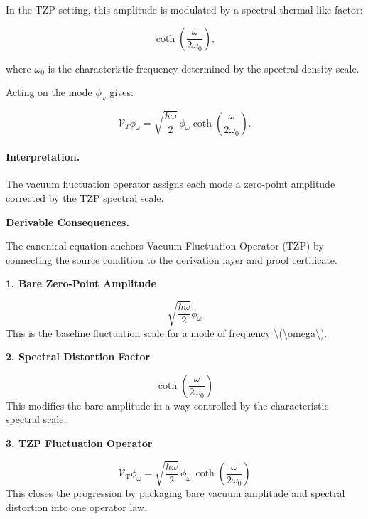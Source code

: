 In the TZP setting, this amplitude is modulated by a spectral thermal-like factor:

\begin{equation}
\coth\left(
\frac{\omega}{2\omega_0}
\right),
\end{equation}

where $\omega_0$ is the characteristic frequency determined by the spectral density scale.

Acting on the mode $\phi_{\omega}$ gives:

\begin{equation}
\boxed{
\mathcal{V}_T\phi_{\omega}
=
\sqrt{
\frac{\hbar\omega}{2}
}
\,\phi_{\omega}
\coth\left(
\frac{\omega}{2\omega_0}
\right).
}
\end{equation}

\paragraph{Interpretation.}
The vacuum fluctuation operator assigns each mode a zero-point amplitude corrected by the TZP spectral scale.

\par\vspace{0.35em}
\noindent\textbf{Derivable Consequences.}\quad
\begingroup
\footnotesize
\raggedright
The canonical equation anchors Vacuum Fluctuation Operator (TZP) by connecting the source condition to the derivation layer and proof certificate.
\par\endgroup

\noindent\textbf{1. Bare Zero-Point Amplitude}\par
\[
\sqrt{\frac{\hbar\omega}{2}}\phi_{\omega}
\]
\noindent This is the baseline fluctuation scale for a mode of frequency \textbackslash{}(\textbackslash{}omega\textbackslash{}).\par
\noindent\textbf{2. Spectral Distortion Factor}\par
\[
\coth\!\left(
\frac{\omega}{2\omega_{0}}
\right)
\]
\noindent This modifies the bare amplitude in a way controlled by the characteristic spectral scale.\par
\noindent\textbf{3. TZP Fluctuation Operator}\par
\[
\mathcal{V}_{\mathrm{T}}\phi_{\omega}
=
\sqrt{\frac{\hbar\omega}{2}}\,
\phi_{\omega}\,
\coth\!\left(
\frac{\omega}{2\omega_{0}}
\right)
\]
\noindent This closes the progression by packaging bare vacuum amplitude and spectral distortion into one operator law.\par

